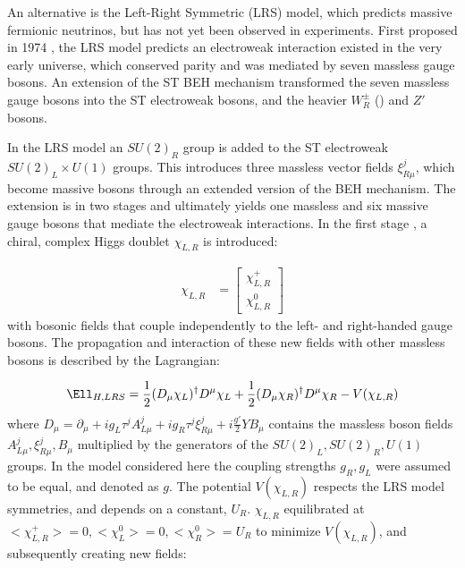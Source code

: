 An alternative is the Left-Right Symmetric (LRS) model, which predicts massive fermionic neutrinos, but has not 
yet been observed in experiments.
First proposed in 1974 \cite{earlyLRSModel}, the LRS model predicts an electroweak 
interaction existed in the very early universe, which conserved parity and was mediated by seven massless 
gauge bosons.  An extension of the ST BEH mechanism transformed the seven massless gauge bosons 
into the ST electroweak bosons, and the heavier $W^{\pm}_{R}$ (\WR) and $Z'$ bosons.

In the LRS model an $SU(2)_{R}$ group is added to the ST electroweak $SU(2)_{L} \times U(1)$ groups.
This introduces three massless vector fields $\xi^{j}_{R\mu}$, which become massive 
bosons through an extended version of the BEH mechanism.  The extension is in two stages and 
ultimately yields one massless and six massive gauge bosons that mediate the electroweak interactions.  
In the first stage \cite{lrsHiggsStageOne}, a chiral, complex Higgs doublet $\chi_{L,R}$ is introduced: 

\begin{align}
	\chi_{L,R} &= \begin{bmatrix}
	\chi^{+}_{L,R} \\
	\chi^{0}_{L,R}
	\end{bmatrix}
	\label{eq:stageOneVEV}
\end{align}
with bosonic fields that couple independently to the left- and right-handed gauge bosons.  The propagation and 
interaction of these new fields with other massless bosons is described by the Lagrangian:

\begin{equation}
	\Ell_{H,LRS} = \frac{1}{2}(D_{\mu}\chi_{L})^{\dagger}D^{\mu}\chi_{L} + \frac{1}{2}(D_{\mu}\chi_{R})^{\dagger}D^{\mu}\chi_{R} - V(\chi_{L,R})
	\label{eq:stageOneHiggsLrs}
\end{equation}
where $D_{\mu} = \partial_{\mu} + ig_{L}\tau^{j}A^{j}_{L\mu} + ig_{R}\tau^{j}\xi^{j}_{R\mu} + i\frac{g'}{2}YB_{\mu}$ contains 
the massless boson fields $A^{j}_{L\mu}, \xi^{j}_{R\mu}, B_{\mu}$ multiplied by the generators of the $SU(2)_{L}, SU(2)_{R}, U(1)$ groups.  
In the model considered here the coupling strengths $g_{R}, g_{L}$ were assumed to be equal, and denoted as $g$.  
The potential $V(\chi_{L,R})$ respects the LRS model symmetries, and depends on a constant, $U_{R}$.  $\chi_{L,R}$ 
equilibrated at $<\chi^{+}_{L,R}> = 0, <\chi^{0}_{L}> = 0, <\chi^{0}_{R}> = U_{R}$ to minimize $V(\chi_{L,R})$, 
and subsequently creating new fields:

